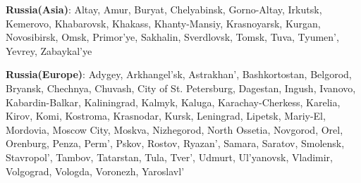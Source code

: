 \item \textbf{Russia(Asia)}: Altay, Amur, Buryat, Chelyabinsk, Gorno-Altay, Irkutsk, Kemerovo, Khabarovsk, Khakass, Khanty-Mansiy, Krasnoyarsk, Kurgan, Novosibirsk, Omsk, Primor'ye, Sakhalin, Sverdlovsk, Tomsk, Tuva, Tyumen', Yevrey, Zabaykal'ye
\item \textbf{Russia(Europe)}: Adygey, Arkhangel'sk, Astrakhan', Bashkortostan, Belgorod, Bryansk, Chechnya, Chuvash, City of St. Petersburg, Dagestan, Ingush, Ivanovo, Kabardin-Balkar, Kaliningrad, Kalmyk, Kaluga, Karachay-Cherkess, Karelia, Kirov, Komi, Kostroma, Krasnodar, Kursk, Leningrad, Lipetsk, Mariy-El, Mordovia, Moscow City, Moskva, Nizhegorod, North Ossetia, Novgorod, Orel, Orenburg, Penza, Perm', Pskov, Rostov, Ryazan', Samara, Saratov, Smolensk, Stavropol', Tambov, Tatarstan, Tula, Tver', Udmurt, Ul'yanovsk, Vladimir, Volgograd, Vologda, Voronezh, Yaroslavl'
